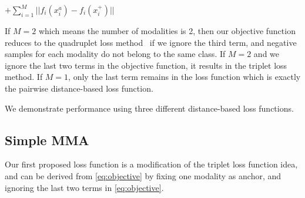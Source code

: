 $+ \sum_{i=1}^{M} ||f_i(x_i^{a}) - f_i(x_i^{+})||$


If $M=2$ which means the number of modalities is 2, then our objective function reduces to the quadruplet loss method~\cite{chen2017beyond} if we ignore the third term, and negative samples for each modality do not belong to the same class.
If $M=2$ and we ignore the last two terms in the objective function, it results in the triplet loss method. 
If $M=1$, only the last term remains in the loss function which is exactly the pairwise distance-based loss function.


We demonstrate performance using three different distance-based loss functions.

\subsection{Simple MMA}
\label{sub:simple-mma}
Our first proposed loss function is a modification of the triplet loss function idea, and can be derived from \cref{eq:objective} by fixing one modality as anchor, and ignoring the last two terms in \cref{eq:objective}.


